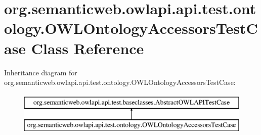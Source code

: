 \hypertarget{classorg_1_1semanticweb_1_1owlapi_1_1api_1_1test_1_1ontology_1_1_o_w_l_ontology_accessors_test_case}{\section{org.\-semanticweb.\-owlapi.\-api.\-test.\-ontology.\-O\-W\-L\-Ontology\-Accessors\-Test\-Case Class Reference}
\label{classorg_1_1semanticweb_1_1owlapi_1_1api_1_1test_1_1ontology_1_1_o_w_l_ontology_accessors_test_case}
}
Inheritance diagram for org.\-semanticweb.\-owlapi.\-api.\-test.\-ontology.\-O\-W\-L\-Ontology\-Accessors\-Test\-Case\-:\begin{figure}[H]
\begin{center}
\leavevmode
\includegraphics[height=2.000000cm]{classorg_1_1semanticweb_1_1owlapi_1_1api_1_1test_1_1ontology_1_1_o_w_l_ontology_accessors_test_case}
\end{center}
\end{figure}
